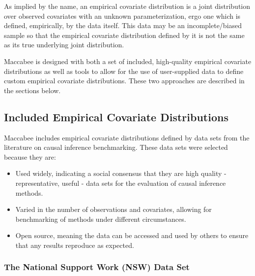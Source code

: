 \documentclass[../main.tex]{subfiles}
\begin{document}
\vspace{\baselineskip}

As implied by the name, an empirical covariate distribution is a joint distribution over observed covariates with an unknown parameterization, ergo one which is defined, empirically, by the data itself. This data may be an incomplete/biased sample so that the empirical covariate distribution defined by it is not the same as its true underlying joint distribution.

\vspace{\baselineskip}

Maccabee is designed with both a set of included, high-quality empirical covariate distributions as well as tools to allow for the use of user-supplied data to define custom empirical covariate distributions. These two approaches are described in the sections below.

\subsection{Included Empirical Covariate Distributions}

Maccabee includes empirical covariate distributions defined by data sets from the literature on causal inference benchmarking. These data sets were selected because they are:

\begin{itemize}
    \item Used widely, indicating a social consensus that they are high quality - representative, useful - data sets for the evaluation of causal inference methods.

    \item Varied in the number of observations and covariates, allowing for benchmarking of methods under different circumstances.

    \item Open source, meaning the data can be accessed and used by others to ensure that any results reproduce as expected.
\end{itemize}

\subsubsection{The National Support Work (NSW) Data Set}
\end{document}
